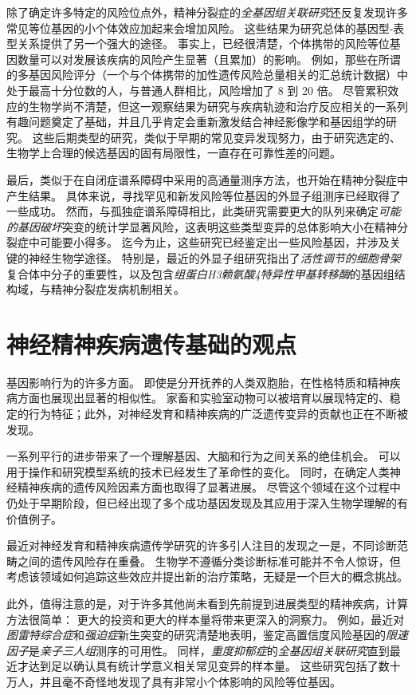 除了确定许多特定的风险位点外，精神分裂症的\textit{全基因组关联研究}还反复发现许多常见等位基因的小个体效应加起来会增加风险。
这些结果为研究总体的基因型-表型关系提供了另一个强大的途径。
事实上，已经很清楚，个体携带的风险等位基因数量可以对发展该疾病的风险产生显著（且累加）的影响。
例如，那些在所谓的多基因风险评分（一个与个体携带的加性遗传风险总量相关的汇总统计数据）中处于最高十分位数的人，与普通人群相比，风险增加了 8 到 20 倍。
尽管累积效应的生物学尚不清楚，但这一观察结果为研究与疾病轨迹和治疗反应相关的一系列有趣问题奠定了基础，并且几乎肯定会重新激发结合神经影像学和基因组学的研究。
这些后期类型的研究，类似于早期的常见变异发现努力，由于研究选定的、生物学上合理的候选基因的固有局限性，一直存在可靠性差的问题。


最后，类似于在自闭症谱系障碍中采用的高通量测序方法，也开始在精神分裂症中产生结果。
具体来说，寻找罕见和新发风险等位基因的外显子组测序已经取得了一些成功。
然而，与孤独症谱系障碍相比，此类研究需要更大的队列来确定\textit{可能的基因破坏}突变的统计学显著风险，这表明这些类型变异的总体影响大小在精神分裂症中可能要小得多。
迄今为止，这些研究已经鉴定出一些风险基因，并涉及关键的神经生物学途径。
特别是，最近的外显子组研究指出了\textit{活性调节的细胞骨架}复合体中分子的重要性，以及包含\textit{组蛋白H3赖氨酸4特异性甲基转移酶}的基因组结构域，与精神分裂症发病机制相关。


\section{神经精神疾病遗传基础的观点}

基因影响行为的许多方面。
即使是分开抚养的人类双胞胎，在性格特质和精神疾病方面也展现出显著的相似性。
家畜和实验室动物可以被培育以展现特定的、稳定的行为特征；此外，对神经发育和精神疾病的广泛遗传变异的贡献也正在不断被发现。


一系列平行的进步带来了一个理解基因、大脑和行为之间关系的绝佳机会。
可以用于操作和研究模型系统的技术已经发生了革命性的变化。
同时，在确定人类神经精神疾病的遗传风险因素方面也取得了显著进展。
尽管这个领域在这个过程中仍处于早期阶段，但已经出现了多个成功基因发现及其应用于深入生物学理解的有价值例子。


最近对神经发育和精神疾病遗传学研究的许多引人注目的发现之一是，不同诊断范畴之间的遗传风险存在重叠。
生物学不遵循分类诊断标准可能并不令人惊讶，但考虑该领域如何追踪这些效应并提出新的治疗策略，无疑是一个巨大的概念挑战。


此外，值得注意的是，对于许多其他尚未看到先前提到进展类型的精神疾病，计算方法很简单：
更大的投资和更大的样本量将带来更深入的洞察力。 
例如，最近对\textit{图雷特综合症}和\textit{强迫症}新生突变的研究清楚地表明，鉴定高置信度风险基因的\textit{限速因子}是\textit{亲子三人组}测序的可用性。
同样，\textit{重度抑郁症}的\textit{全基因组关联研究}直到最近才达到足以确认具有统计学意义相关常见变异的样本量。 
这些研究包括了数十万人，并且毫不奇怪地发现了具有非常小个体影响的风险等位基因。


